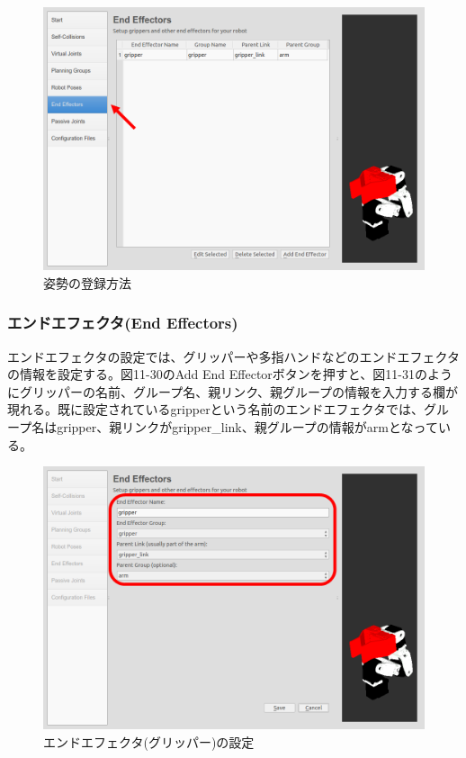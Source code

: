 \begin{figure}[ht]
  \centering
  \includegraphics[width=\columnwidth]{pictures/chapter11/pic_11_29.png}
  \caption{姿勢の登録方法}
\end{figure}

\subsubsection{エンドエフェクタ(End Effectors)}

エンドエフェクタの設定では、グリッパーや多指ハンドなどのエンドエフェクタの情報を設定する。図11-30のAdd End Effectorボタンを押すと、図11-31のようにグリッパーの名前、グループ名、親リンク、親グループの情報を入力する欄が現れる。既に設定されているgripperという名前のエンドエフェクタでは、グループ名はgripper、親リンクがgripper\_link、親グループの情報がarmとなっている。

\begin{figure}[ht]
  \centering
  \includegraphics[width=\columnwidth]{pictures/chapter11/pic_11_30.png}
  \caption{エンドエフェクタ(グリッパー)の設定}
\end{figure}

